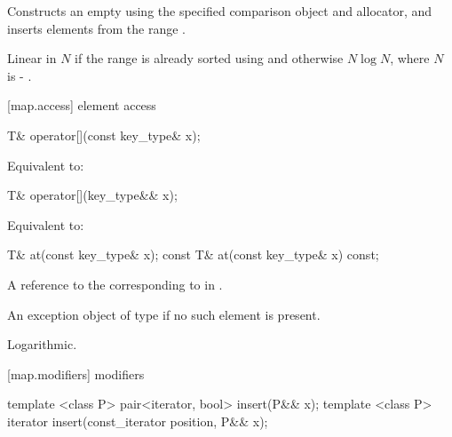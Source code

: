 \begin{itemdescr}
\pnum
\effects
Constructs an empty
using the specified comparison object and allocator,
and inserts elements from the range
.

\pnum
\complexity
Linear in $N$ if the range
is already sorted using 
and otherwise $N \log{N}$, where $N$
is  - .
\end{itemdescr}

[map.access]{ element access}

%
\begin{itemdecl}
T& operator[](const key_type& x);
\end{itemdecl}

\begin{itemdescr}
\pnum
\effects
Equivalent to: 
\end{itemdescr}

%
\begin{itemdecl}
T& operator[](key_type&& x);
\end{itemdecl}

\begin{itemdescr}
\pnum
\effects
Equivalent to: 
\end{itemdescr}

%
\begin{itemdecl}
T&       at(const key_type& x);
const T& at(const key_type& x) const;
\end{itemdecl}

\begin{itemdescr}
\pnum
\returns
A reference to the  corresponding to  in .

\pnum
\throws
An exception object of type  if
no such element is present.

\pnum
\complexity Logarithmic.
\end{itemdescr}

[map.modifiers]{ modifiers}

%
\begin{itemdecl}
template <class P> pair<iterator, bool> insert(P&& x);
template <class P> iterator insert(const_iterator position, P&& x);
\end{itemdecl}

